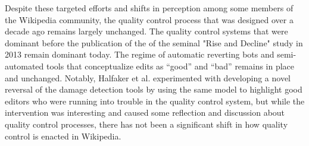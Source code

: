 Despite these targeted efforts and shifts in perception among some members of the Wikipedia community, the quality control process that was designed over a decade ago remains largely unchanged\cite{halfaker2014snuggle}.  The quality control systems that were dominant before the publication of the of the seminal "Rise and Decline" study in 2013\cite{halfaker2013rise} remain dominant today.  The regime of automatic reverting bots and semi-automated tools that conceptualize edits as ``good'' and ``bad'' remains in place and unchanged.  Notably, Halfaker et al. experimented with developing a novel reversal of the damage detection tools by using the same model to highlight good editors who were running into trouble in the quality control system\cite{halfaker2014snuggle}, but while the intervention was interesting and caused some reflection and discussion about quality control processes, there has not been a significant shift in how quality control is enacted in Wikipedia.
